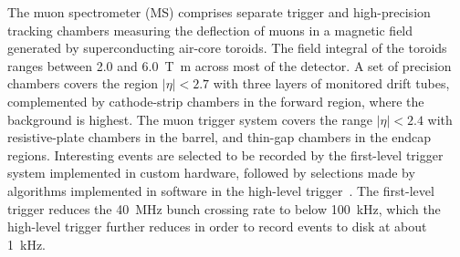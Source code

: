 The muon spectrometer (MS) comprises separate trigger and
high-precision tracking chambers measuring the deflection of muons in a magnetic field generated by superconducting air-core toroids.
The field integral of the toroids ranges between \num{2.0} and \SI{6.0}{\tesla\metre}
across most of the detector. 
A set of precision chambers covers the region \(|\eta| < 2.7\) with three layers of monitored drift tubes,
complemented by cathode-strip chambers in the forward region, where the background is highest.
The muon trigger system covers the range \(|\eta| < 2.4\) with resistive-plate chambers in the barrel, and thin-gap chambers in the endcap regions.
Interesting events are selected to be recorded by the first-level trigger system implemented in custom hardware, followed by selections made by algorithms implemented in software in the high-level trigger~\cite{TRIG-2016-01}. 
The first-level trigger reduces the 40~MHz bunch crossing rate to below \SI{100}{\kHz}, which the high-level trigger further reduces in order to record events to disk at about \SI{1}{\kHz}.


